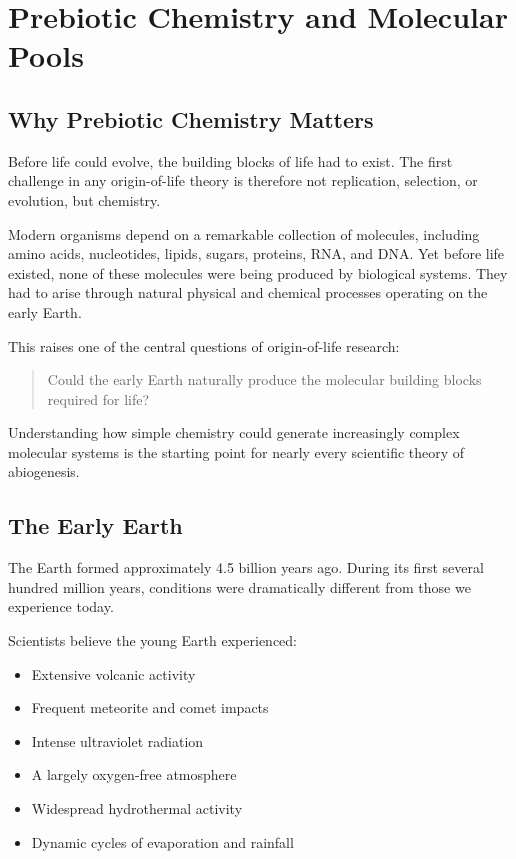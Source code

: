 \documentclass[
  oneside,
  openany]{book}
\providecommand{\tightlist}{%
  \setlength{\itemsep}{0pt}\setlength{\parskip}{0pt}}
\begin{document}
\chapter{Prebiotic Chemistry and Molecular Pools}\label{prebiotic-chemistry-and-molecular-pools}

\section{Why Prebiotic Chemistry Matters}\label{why-prebiotic-chemistry-matters}

Before life could evolve, the building blocks of life had to exist. The first challenge in any origin-of-life theory is therefore not replication, selection, or evolution, but chemistry.

Modern organisms depend on a remarkable collection of molecules, including amino acids, nucleotides, lipids, sugars, proteins, RNA, and DNA. Yet before life existed, none of these molecules were being produced by biological systems. They had to arise through natural physical and chemical processes operating on the early Earth.

This raises one of the central questions of origin-of-life research:

\begin{quote}
Could the early Earth naturally produce the molecular building blocks required for life?
\end{quote}

Understanding how simple chemistry could generate increasingly complex molecular systems is the starting point for nearly every scientific theory of abiogenesis.

\section{The Early Earth}\label{the-early-earth}

The Earth formed approximately 4.5 billion years ago. During its first several hundred million years, conditions were dramatically different from those we experience today.

Scientists believe the young Earth experienced:

\begin{itemize}
\tightlist
\item
  Extensive volcanic activity
\item
  Frequent meteorite and comet impacts
\item
  Intense ultraviolet radiation
\item
  A largely oxygen-free atmosphere
\item
  Widespread hydrothermal activity
\item
  Dynamic cycles of evaporation and rainfall
\end{itemize}
\end{document}

